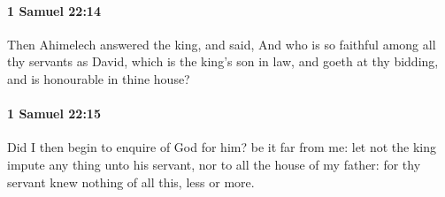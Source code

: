 		\paragraph{1 Samuel 22:14} %
			\label{1SAMUEL-22-14}

			Then Ahimelech answered the king, and said, And who is so faithful among all thy servants as David, which is the king’s son in law, and goeth at thy bidding, and is honourable in thine house?


		\paragraph{1 Samuel 22:15} %
			\label{1SAMUEL-22-15}

			Did I then begin to enquire of God for him? be it far from me: let not the king impute any thing unto his servant, nor to all the house of my father: for thy servant knew nothing of all this, less or more.

